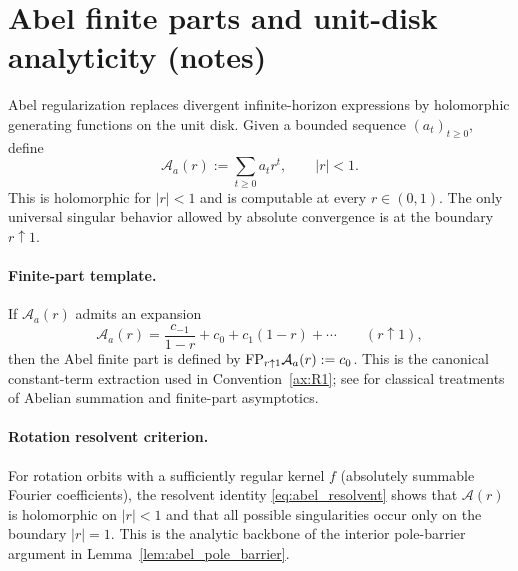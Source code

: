 
\section{Abel finite parts and unit-disk analyticity (notes)}
\label{app:abel_finite_part}

Abel regularization replaces divergent infinite-horizon expressions by holomorphic generating functions on the unit disk.
Given a bounded sequence $(a_t)_{t\ge 0}$, define
\[
\mathcal{A}_a(r):=\sum_{t\ge 0} a_t r^t,\qquad |r|<1.
\]
This is holomorphic for $|r|<1$ and is computable at every $r\in(0,1)$.
The only universal singular behavior allowed by absolute convergence is at the boundary $r\uparrow 1$.

\paragraph{Finite-part template.}
If $\mathcal{A}_a(r)$ admits an expansion
\[
\mathcal{A}_a(r)=\frac{c_{-1}}{1-r}+c_0+c_1(1-r)+\cdots
\qquad (r\uparrow 1),
\]
then the Abel finite part is defined by $\mathrm{FP}_{r\uparrow 1}\mathcal{A}_a(r):=c_0$.
This is the canonical constant-term extraction used in Convention~\ref{ax:R1}; see \cite{Hardy1949,EstradaKanwal2002} for classical treatments of Abelian summation and finite-part asymptotics.

\paragraph{Rotation resolvent criterion.}
For rotation orbits with a sufficiently regular kernel $f$ (absolutely summable Fourier coefficients), the resolvent identity \eqref{eq:abel_resolvent} shows that $\mathcal{A}(r)$ is holomorphic on $|r|<1$ and that all possible singularities occur only on the boundary $|r|=1$.
This is the analytic backbone of the interior pole-barrier argument in Lemma~\ref{lem:abel_pole_barrier}.

